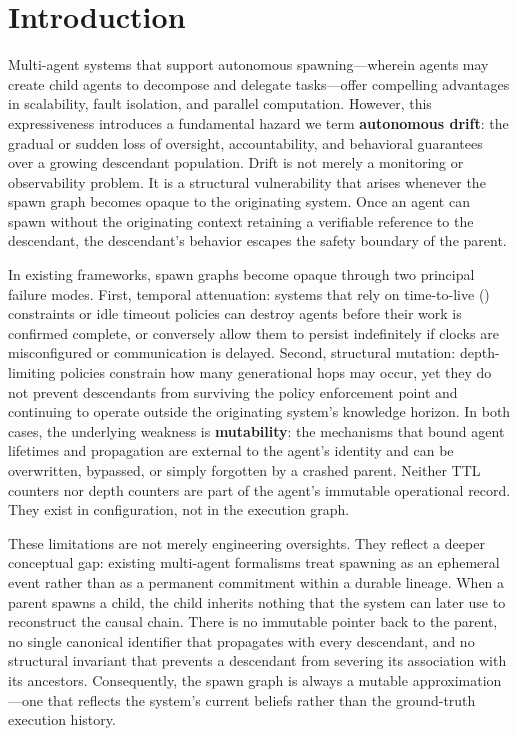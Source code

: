 \section{Introduction}

Multi-agent systems that support autonomous spawning—wherein agents may create child agents to decompose and delegate tasks—offer compelling advantages in scalability, fault isolation, and parallel computation. However, this expressiveness introduces a fundamental hazard we term \textbf{autonomous drift}: the gradual or sudden loss of oversight, accountability, and behavioral guarantees over a growing descendant population. Drift is not merely a monitoring or observability problem. It is a structural vulnerability that arises whenever the spawn graph becomes opaque to the originating system. Once an agent can spawn without the originating context retaining a verifiable reference to the descendant, the descendant's behavior escapes the safety boundary of the parent.

In existing frameworks, spawn graphs become opaque through two principal failure modes. First, temporal attenuation: systems that rely on time-to-live (\TTL) constraints or idle timeout policies can destroy agents before their work is confirmed complete, or conversely allow them to persist indefinitely if clocks are misconfigured or communication is delayed. Second, structural mutation: depth-limiting policies constrain how many generational hops may occur, yet they do not prevent descendants from surviving the policy enforcement point and continuing to operate outside the originating system's knowledge horizon. In both cases, the underlying weakness is \textbf{mutability}: the mechanisms that bound agent lifetimes and propagation are external to the agent's identity and can be overwritten, bypassed, or simply forgotten by a crashed parent. Neither TTL counters nor depth counters are part of the agent's immutable operational record. They exist in configuration, not in the execution graph.

These limitations are not merely engineering oversights. They reflect a deeper conceptual gap: existing multi-agent formalisms treat spawning as an ephemeral event rather than as a permanent commitment within a durable lineage. When a parent spawns a child, the child inherits nothing that the system can later use to reconstruct the causal chain. There is no immutable pointer back to the parent, no single canonical identifier that propagates with every descendant, and no structural invariant that prevents a descendant from severing its association with its ancestors. Consequently, the spawn graph is always a mutable approximation—one that reflects the system's current beliefs rather than the ground-truth execution history.

